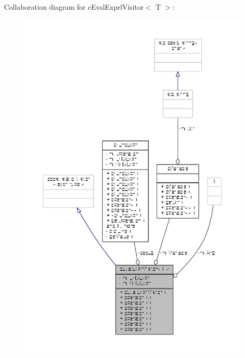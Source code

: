 Collaboration diagram for c\-Eval\-Exprl\-Visitor$<$ T $>$\-:
\nopagebreak
\begin{figure}[H]
\begin{center}
\leavevmode
\includegraphics[width=350pt]{classcEvalExprlVisitor__coll__graph}
\end{center}
\end{figure}

